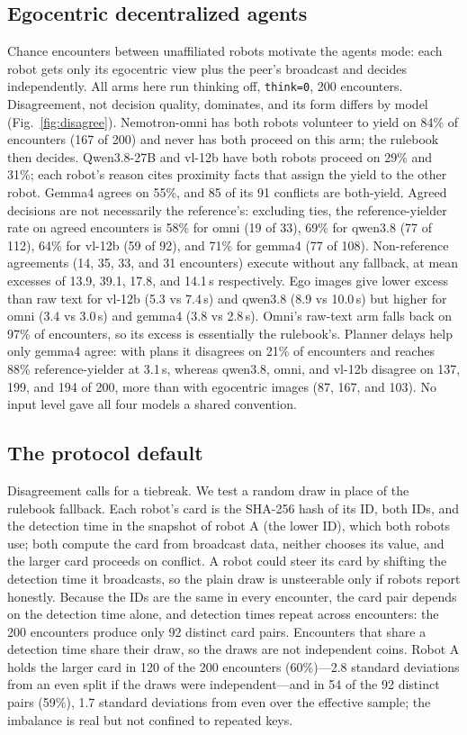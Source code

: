 \documentclass[journal]{IEEEtran}
\begin{document}
\subsection{Egocentric decentralized agents}
\label{sec:ego}
Chance encounters between unaffiliated robots motivate the agents mode: each robot gets only its egocentric view plus the peer's broadcast and decides independently. All arms here run thinking off, \texttt{think=0}, 200 encounters. Disagreement, not decision quality, dominates, and its form differs by model (Fig.~\ref{fig:disagree}). Nemotron-omni has both robots volunteer to yield on 84\% of encounters (167 of 200) and never has both proceed on this arm; the rulebook then decides. Qwen3.8-27B and vl-12b have both robots proceed on 29\% and 31\%; each robot's reason cites proximity facts that assign the yield to the other robot. Gemma4 agrees on 55\%, and 85 of its 91 conflicts are both-yield. Agreed decisions are not necessarily the reference's: excluding ties, the reference-yielder rate on agreed encounters is 58\% for omni (19 of 33), 69\% for qwen3.8 (77 of 112), 64\% for vl-12b (59 of 92), and 71\% for gemma4 (77 of 108). Non-reference agreements (14, 35, 33, and 31 encounters) execute without any fallback, at mean excesses of 13.9, 39.1, 17.8, and 14.1\,s respectively. %
Ego images give lower excess than raw text for vl-12b (5.3 vs 7.4\,s) and qwen3.8 (8.9 vs 10.0\,s) but higher for omni (3.4 vs 3.0\,s) and gemma4 (3.8 vs 2.8\,s). Omni's raw-text arm falls back on 97\% of encounters, so its excess is essentially the rulebook's. Planner delays help only gemma4 agree: with plans it disagrees on 21\% of encounters and reaches 88\% reference-yielder at 3.1\,s, whereas qwen3.8, omni, and vl-12b disagree on 137, 199, and 194 of 200, more than with egocentric images (87, 167, and 103). No input level gave all four models a shared convention.
\subsection{The protocol default}
\label{sec:tiebreak}
Disagreement calls for a tiebreak. We test a random draw in place of the rulebook fallback. Each robot's card is the SHA-256 hash of its ID, both IDs, and the detection time in the snapshot of robot A (the lower ID), which both robots use; both compute the card from broadcast data, neither chooses its value, and the larger card proceeds on conflict. A robot could steer its card by shifting the detection time it broadcasts, so the plain draw is unsteerable only if robots report honestly. Because the IDs are the same in every encounter, the card pair depends on the detection time alone, and detection times repeat across encounters: the 200 encounters produce only 92 distinct card pairs. Encounters that share a detection time share their draw, so the draws are not independent coins. Robot A holds the larger card in 120 of the 200 encounters (60\%)---2.8 standard deviations from an even split if the draws were independent---and in 54 of the 92 distinct pairs (59\%), 1.7 standard deviations from even over the effective sample; the imbalance is real but not confined to repeated keys.
\end{document}
